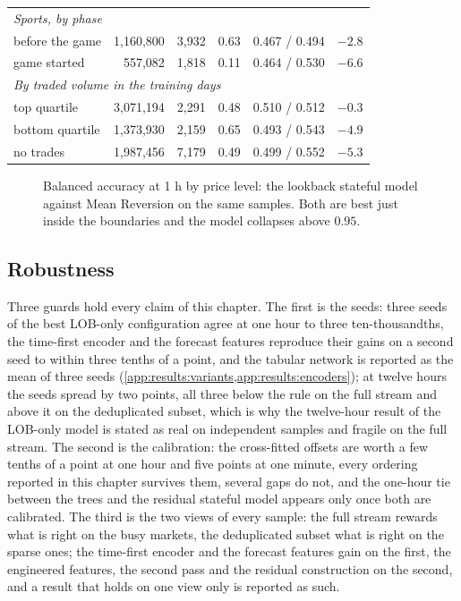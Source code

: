\begin{table}[t]
\begin{fittable}
\begin{tabular}{lrrccc}
\midrule
\multicolumn{6}{l}{\emph{Sports, by phase}} \\
before the game   & 1{,}160{,}800 & 3{,}932 & 0.63 & 0.467 / 0.494 & $-2.8$ \\
game started      &   557{,}082   & 1{,}818 & 0.11 & 0.464 / 0.530 & $-6.6$ \\
\midrule
\multicolumn{6}{l}{\emph{By traded volume in the training days}} \\
top quartile      & 3{,}071{,}194 & 2{,}291 & 0.48 & 0.510 / 0.512 & $-0.3$ \\
bottom quartile   & 1{,}373{,}930 & 2{,}159 & 0.65 & 0.493 / 0.543 & $-4.9$ \\
no trades         & 1{,}987{,}456 & 7{,}179 & 0.49 & 0.499 / 0.552 & $-5.3$ \\
\bottomrule
\end{tabular}\end{fittable}
\end{table}

\begin{figure}[t]
\centering

\caption{Balanced accuracy at 1 h by price level: the lookback stateful model against
Mean Reversion on the same samples.  Both are best just inside the boundaries and the model
collapses above $0.95$.}
\label{fig:horizons:pricelevel}
\end{figure}

\subsection{Robustness}
\label{sec:horizons:robustness}
\label{sec:horizons:short-tests}

Three guards hold every claim of this chapter.  The first is the seeds: three seeds of the
best LOB-only configuration agree at one hour to three ten-thousandths, the time-first
encoder and the forecast features reproduce their gains on a second seed to within three
tenths of a point, and the tabular network is reported as the mean of three seeds
(\cref{app:results:variants,app:results:encoders}); at twelve hours the seeds spread by two
points, all three below the rule on the full stream and above it on the deduplicated
subset, which is why the twelve-hour
result of the LOB-only model is stated as real on independent samples and fragile on the
full stream.  The second is the calibration: the cross-fitted offsets are worth a few tenths
of a point at one hour and five points at one minute, every ordering reported in this
chapter survives them, several gaps do not, and the one-hour tie between the trees and the
residual stateful model appears only once both are calibrated.  The third is the two views
of every sample: the full stream rewards what is right on the busy markets, the
deduplicated subset what is right on the sparse ones; the time-first encoder and the
forecast features gain on the first, the engineered features, the second pass and the
residual construction on the second, and a result that holds on one view only is reported
as such.

